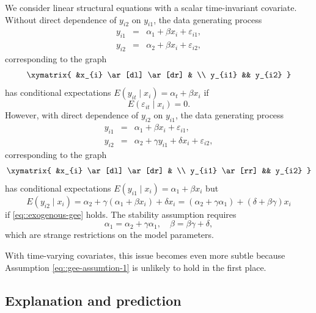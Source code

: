We consider linear structural equations with a scalar time-invariant covariate. Without direct dependence of $y_{i2}$ on $y_{i1}$, the data generating process
\begin{eqnarray*}
y_{i1} &=& \alpha_1 + \beta  x_i  + \varepsilon_{i1},\\
y_{i2} &=& \alpha_2 + \beta x_i  + \varepsilon_{i2},
\end{eqnarray*}
corresponding to the graph
$$
\xymatrix{
&x_{i} \ar[dl]  \ar[dr] &  \\
y_{i1}   && y_{i2} 
}
$$
has conditional expectations $E(y_{it}\mid x_{i}) =  \alpha_t +  \beta  x_i   $ if 
\begin{equation}
\label{eq::exogenous-gee}
  E(\varepsilon_{it}\mid x_i) = 0.
\end{equation}
However, with direct dependence of $y_{i2}$ on $y_{i1}$, the data generating process
\begin{eqnarray*}
y_{i1} &=& \alpha_1 +  \beta x_i  + \varepsilon_{i1},\\
y_{i2} &=& \alpha_2 +  \gamma  y_{i1}   + \delta x_i   + \varepsilon_{i2},
\end{eqnarray*}
corresponding to the graph
$$
\xymatrix{
&x_{i} \ar[dl]  \ar[dr] &  \\
y_{i1}  \ar[rr] && y_{i2} 
}
$$
has conditional expectations $E(y_{i1}\mid x_{i}) = \alpha_1 +  \beta   x_i $ but 
$$
E(y_{i2}\mid x_{i}) = \alpha_2 +   \gamma  (\alpha_1 +  \beta   x_i)  + \delta x_i  = (\alpha_2 +   \gamma  \alpha_1) +    ( \delta + \beta\gamma )   x_i 
$$ 
if \eqref{eq::exogenous-gee} holds. The stability assumption requires 
$$
 \alpha_1 = \alpha_2 +   \gamma  \alpha_1,\quad  \beta = \beta\gamma + \delta , 
$$ 
which are strange restrictions on the model parameters. 

With time-varying covariates, this issue becomes even more subtle because Assumption \eqref{eq::gee-assumtion-1} is unlikely to hold in the first place. 


\subsection{Explanation and prediction}


